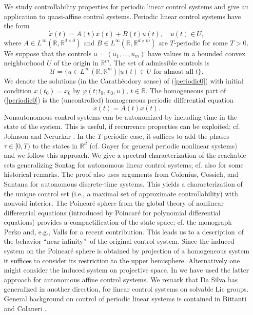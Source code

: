 \documentclass{siamltex}%
\begin{document}
We study controllability properties for periodic linear control systems and
give an application to quasi-affine control systems. Periodic linear control
systems have the form
\begin{equation}
\dot{x}(t)=A(t)x(t)+B(t)u(t),\quad u(t)\in U, \label{periodic0}%
\end{equation}
where $A\in L^{\infty}(\mathbb{R},\mathbb{R}^{d\times d})$ and $B\in
L^{\infty}(\mathbb{R},\mathbb{R}^{d\times m})$ are $T$-periodic for some
$T>0$. We suppose that the controls $u=(u_{1},\ldots,u_{m})$ have values in a
bounded convex neighborhood $U$ of the origin in $\mathbb{R}^{m}$. The set of
admissible controls is
\[
\mathcal{U}=\{u\in L^{\infty}(\mathbb{R},\mathbb{R}^{m})\left\vert u(t)\in
U\text{ for almost all }t\right.  \}.
\]
We denote the solutions (in the Carath\'{e}odory sense) of (\ref{periodic0})
with initial condition $x(t_{0})=x_{0}$ by $\varphi(t;t_{0},x_{0}%
,u),\,t\in\mathbb{R}$. The homogeneous part of (\ref{periodic0}) is the
(uncontrolled) homogeneous periodic differential equation
\begin{equation}
\dot{x}(t)=A(t)x(t). \label{hom}%
\end{equation}
Nonautonomous control systems can be autonomized by including time in the
state of the system. This is useful, if recurrence properties can be
exploited; cf. Johnson and Nerurkar \cite{JoNer92}. In the $T$-periodic case,
it suffices to add the phases $\tau\in\lbrack0,T)$ to the states in
$\mathbb{R}^{d}$ (cf. Gayer \cite{Gayer05} for general periodic nonlinear
systems) and we follow this approach. We give a spectral characterization of
the reachable sets generalizing Sontag \cite[Corollary 3.6.7]{Son98} for
autonomous linear control systems; cf. also \cite[p. 139]{Son98} for some
historical remarks. The proof also uses arguments from Colonius, Cossich, and
Santana \cite[Theorem 15]{ColCS22} for autonomous discrete-time systems. This
yields a characterization of the unique control set (i.e., a maximal set of
approximate controllability) with nonvoid interior. The Poincar\'{e} sphere
from the global theory of nonlinear differential equations (introduced by
Poincar\'{e} \cite{Poin} for polynomial differential equations) provides a
compactification of the state space; cf. the monograph Perko \cite[Section
3.10]{Perko} and, e.g., Valls \cite{Valls22} for a recent contribution. This
leads us to a description\ of the behavior \textquotedblleft near
infinity\textquotedblright\ of the original control system. Since the induced
system on the Poincar\'{e} sphere is obtained by projection of a homogeneous
system it suffices to consider its restriction to the upper hemisphere.
Alternatively one might consider the induced system on projective space. In
\cite{ColSS22} we have used the latter approach for autonomous affine control
systems. We remark that Da Silva \cite{DaS16} has generalized \cite[Corollary
3.6.7]{Son98} in another direction, for linear control systems on solvable Lie
groups. General background on control of periodic linear systems is contained
in Bittanti and Colaneri \cite{Bitt}.
\end{document}
